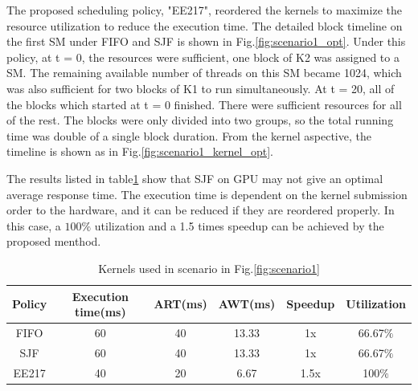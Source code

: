 \documentclass[conference]{IEEEtran}
\begin{document}
The proposed scheduling policy, "EE217", reordered the kernels to maximize the resource utilization to reduce the execution time. The detailed block timeline on the first SM under FIFO and SJF is shown in Fig.\ref{fig:scenario1_opt}. Under this policy, at t = 0, the resources were sufficient, one block of K2 was assigned to a SM. The remaining available number of threads on this SM became 1024, which was also sufficient for two blocks of K1 to run simultaneously. At t = 20, all of the blocks which started at t = 0 finished. There were sufficient resources for all of the rest. The blocks were only divided into two groups, so the total running time was double of a single block duration. From the kernel aspective, the timeline is shown as in Fig.\ref{fig:scenario1_kernel_opt}.

 The results listed in table\ref{table:scenario1_result} show that SJF on GPU may not give an optimal average response time. The execution time is dependent on the kernel submission order to the hardware, and it can be reduced if they are reordered properly. In this case, a $100\%$ utilization and a 1.5 times speedup can be achieved by the proposed menthod.\par



\begin{table}[h]
   \caption{Kernels used in scenario in Fig.\ref{fig:scenario1}}
   \centering
   \begin{tabular}{|c|c|c|c|c|c|}
   \hline
   \bf Policy & \bf Execution time(ms)& \bf ART(ms) & \bf AWT(ms) & \bf Speedup & \bf Utilization \\
   \hline
   FIFO & 60 & 40 & 13.33 & 1x & 66.67$\%$ \\
   SJF & 60 & 40 & 13.33 & 1x & 66.67$\%$\\ 
   EE217 & 40 & 20 & 6.67 & 1.5x & 100$\%$\\
   \hline
   \end{tabular}
   \label{table:scenario1_result}
\end{table}
\end{document}
